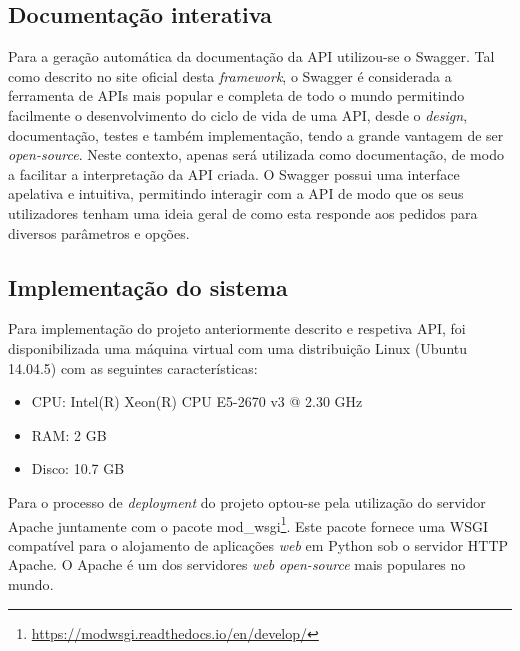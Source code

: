 \subsection{Documentação interativa}


Para a geração automática da documentação da \ac{API} utilizou-se o Swagger. Tal como descrito no site oficial desta \textit{framework}\cite{SmartBearSoftware2017}, o Swagger é considerada a ferramenta de APIs mais popular e completa de todo o mundo permitindo facilmente o desenvolvimento do ciclo de vida de uma \ac{API}, desde o \textit{design}, documentação, testes e também implementação, tendo a grande vantagem de ser \textit{open-source}. Neste contexto, apenas será utilizada como documentação, de modo a facilitar a interpretação da \ac{API} criada. O Swagger possui uma interface apelativa e intuitiva, permitindo interagir com a \ac{API} de modo que os seus utilizadores tenham uma ideia geral de como esta responde aos pedidos para diversos parâmetros e opções. 





\subsection{Implementação do sistema}

Para implementação do projeto anteriormente descrito e respetiva API, foi disponibilizada uma máquina virtual com uma distribuição Linux (Ubuntu 14.04.5) com as seguintes características: 

\begin{itemize}
	\item \ac{CPU}: Intel(R) Xeon(R) CPU E5-2670 v3 @ 2.30 GHz
	\item \ac{RAM}: 2 GB
	\item Disco: 10.7 GB
\end{itemize}


Para o processo de \textit{deployment} do projeto optou-se pela utilização do servidor Apache juntamente com o pacote mod\_wsgi\footnote{\url{https://modwsgi.readthedocs.io/en/develop/}}. 
Este pacote fornece uma \ac{WSGI} compatível para o alojamento de aplicações \textit{web} em Python sob o servidor \ac{HTTP} Apache. O Apache é um dos servidores \textit{web} \textit{open-source} mais  populares no mundo\cite{TheApacheSoftwareFoundation2016}.







